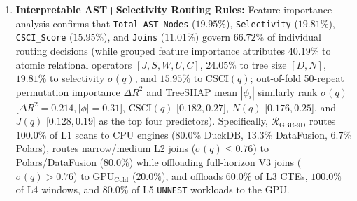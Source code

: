 \documentclass[10pt,a4paper]{article}
\begin{document}
\begin{enumerate}[leftmargin=1.5em,itemsep=2pt]
    \item \textbf{Interpretable AST+Selectivity Routing Rules:} Feature importance analysis confirms that \texttt{Total\_\allowbreak{}AST\_\allowbreak{}Nodes} ($\mathbf{19.95\%}$), \texttt{Selectivity} ($\mathbf{19.81\%}$), \texttt{CSCI\_\allowbreak{}Score} ($\mathbf{15.95\%}$), and \texttt{Joins} ($\mathbf{11.01\%}$) govern $66.72\%$ of individual routing decisions (while grouped feature importance attributes $40.19\%$ to atomic relational operators $[J,S,W,U,C]$, $24.05\%$ to tree size $[D,N]$, $19.81\%$ to selectivity $\sigma(q)$, and $15.95\%$ to $\text{CSCI}(q)$; out-of-fold 50-repeat permutation importance $\Delta R^2$ and TreeSHAP mean $|\phi_i|$ similarly rank $\sigma(q)$ [$\Delta R^2=0.214, |\phi|=0.31$], $\text{CSCI}(q)$ [$0.182, 0.27$], $N(q)$ [$0.176, 0.25$], and $J(q)$ [$0.128, 0.19$] as the top four predictors). Specifically, $\mathcal{R}_{\text{GBR-9D}}$ routes $100.0\%$ of L1 scans to CPU engines ($80.0\%$ DuckDB, $13.3\%$ DataFusion, $6.7\%$ Polars), routes narrow/medium L2 joins ($\sigma(q) \le 0.76$) to Polars/DataFusion ($80.0\%$) while offloading full-horizon V3 joins ($\sigma(q) > 0.76$) to $\text{GPU}_{\text{Cold}}$ ($20.0\%$), and offloads $60.0\%$ of L3 CTEs, $100.0\%$ of L4 windows, and $80.0\%$ of L5 \texttt{UNNEST} workloads to the GPU.
\end{enumerate}
\end{document}
